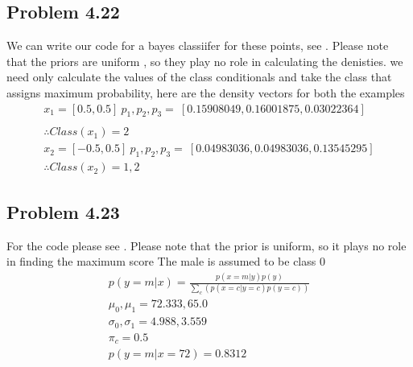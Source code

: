 \subsection{Problem 4.22}
We can write our code for a bayes classiifer for these points, see \cite{CS3390}. Please note that the 
priors are uniform , so they play no role in calculating the denisties.
we need only calculate the values of the class conditionals and take the class that assigns maximum probability,
here are the density vectors for both the examples
\begin{gather}
    x_1 = [0.5, 0.5] \ p_1, p_2, p_3  = \    [0.15908049 , 0.16001875,  0.03022364] \\
    \\
    \therefore   Class(x_1) = 2
    \\
    x_2 = [-0.5, 0.5] \ p_1, p_2, p_3 = \ [0.04983036 , 0.04983036,  0.13545295]
    \\
    \therefore Class(x_2) = 1,2
\end{gather}
\subsection{Problem 4.23}
For the code please see \cite{CS3390}.
Please note that the prior is uniform, so it plays no role in finding the maximum score
The male is assumed to be class 0 
\begin{gather}
    p(y = m | x) = \frac{p(x = m | y)p(y)}{\sum_c ( p ( x = c | y  = c)p(y =c))}
    \\
    \mu_0 , \mu_1 = 72.333, 65.0
    \\
    \sigma_0 , \sigma_1  = 4.988, 3.559
    \\
    \pi_c = 0.5
    \\
    p(y  = m | x = 72) = 0.8312
\end{gather}


